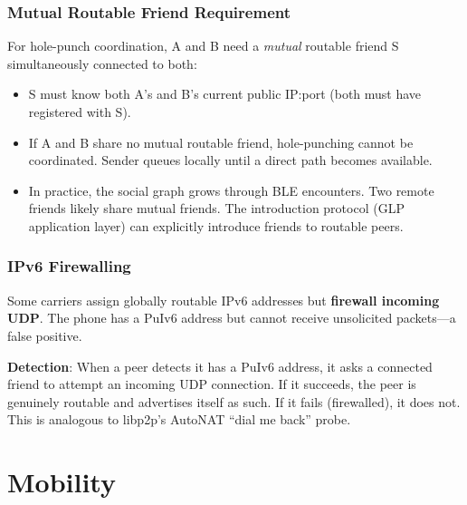 \documentclass[11pt,a4paper]{article}
\begin{document}
\subsubsection{Mutual Routable Friend Requirement}

For hole-punch coordination, A and B need a \emph{mutual} routable friend S simultaneously connected to both:

\begin{itemize}[nosep]
  \item S must know both A's and B's current public IP:port (both must have registered with S).
  \item If A and B share no mutual routable friend, hole-punching cannot be coordinated. Sender queues locally until a direct path becomes available.
  \item In practice, the social graph grows through BLE encounters. Two remote friends likely share mutual friends. The introduction protocol (GLP application layer) can explicitly introduce friends to routable peers.
\end{itemize}

\subsubsection{IPv6 Firewalling}

Some carriers assign globally routable IPv6 addresses but \textbf{firewall incoming UDP}. The phone has a PuIv6 address but cannot receive unsolicited packets---a false positive.

\textbf{Detection}: When a peer detects it has a PuIv6 address, it asks a connected friend to attempt an incoming UDP connection. If it succeeds, the peer is genuinely routable and advertises itself as such. If it fails (firewalled), it does not. This is analogous to libp2p's AutoNAT ``dial me back'' probe.

\section{Mobility}
\end{document}
